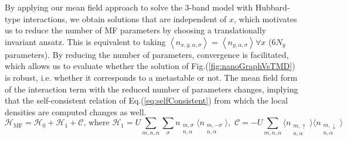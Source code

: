 By applying our mean field approach to solve the 3-band model with Hubbard-type interactions, we obtain solutions that are independent of $x$, which motivates us to reduce the number of MF parameters by choosing a translationally invariant ansatz.
This is equivalent to taking $\left\langle n_{x, y,\alpha, \sigma}\right\rangle = \left\langle n_{y,\alpha, \sigma}\right\rangle  \forall x$ ($6 N_y$ parameters).
By reducing the number of parameters, convergence is facilitated, which allows us to evaluate whether the solution of Fig.(\ref{fig:nanoGraphVsTMD}) is robust, i.e. whether it corresponds to a metastable or not.
The mean field form of the interaction term with the reduced number of parameters changes, implying that the self-consistent relation of Eq.(\ref{eq:selfConsistent}) from which the local densities are computed changes as well.
\begin{equation}
\mathcal{H}_{\text{MF}} = \mathcal{H}_0 + \mathcal{H}_1 + \mathcal{C} , \,\text{where} \,\, \mathcal{H}_1 = U \sum_{m, n, \alpha}  \sum_\sigma n_{\substack{m, \sigma \\ n, \alpha}} \big\langle n_{\substack{m, -\sigma \\ n, \alpha}} \big\rangle  , \,\, \mathcal{C} = -U  \sum_{m, n, \alpha} \big\langle n_{\substack{m, \uparrow \\ n, \alpha}} \big\rangle \big\langle n_{\substack{m, \downarrow \\ n, \alpha}} \big\rangle
\end{equation}
